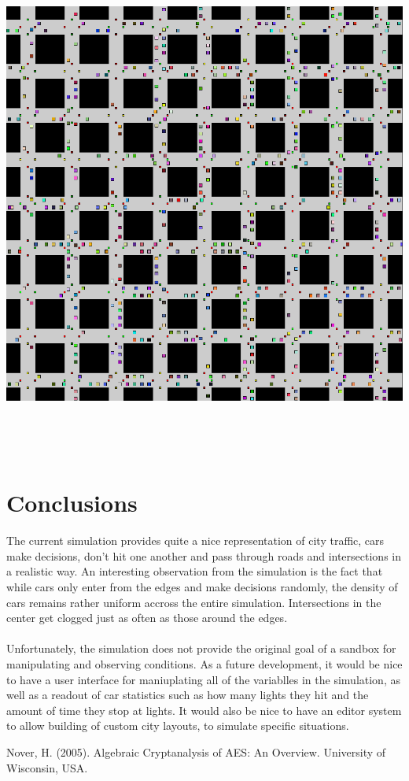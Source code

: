 \documentclass{article}
\begin{document}
\centerline{\includegraphics[width=15cm, height=15cm]{full_sim}}

\hfill\\

\section{Conclusions}

The current simulation provides quite a nice representation of city traffic, cars make decisions, don't hit one another and pass through roads and intersections in a realistic way. An interesting observation from the simulation is the fact that while cars only enter from the edges and make decisions randomly, the density of cars remains rather uniform accross the entire simulation. Intersections in the center get clogged just as often as those around the edges.\\\\
Unfortunately, the simulation does not provide the original goal of a sandbox for manipulating and observing conditions.  As a future development, it would be nice to have a user interface for maniuplating all of the variablles in the simulation, as well as a readout of car statistics such as how many lights they hit and the amount of time they stop at lights.  It would also be nice to have an editor system to allow building of custom city layouts, to simulate specific situations.

\pagebreak

\begin{thebibliography}{99}

 Nover, H. (2005). Algebraic Cryptanalysis of AES: An Overview. University of Wisconsin, USA.

\end{thebibliography}
\end{document}
